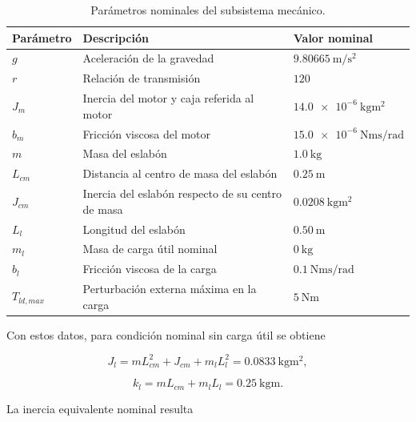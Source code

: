 \documentclass[10pt,a4paper]{article}
\begin{document}
\begin{table}[H]
    \centering
    \caption{Parámetros nominales del subsistema mecánico.}
    \label{tab:parametros_mecanicos}
    \begin{tabular}{lll}
        \toprule
        Parámetro & Descripción & Valor nominal \\
        \midrule
        \(g\) & Aceleración de la gravedad & \(\SI{9.80665}{\meter\per\second\squared}\) \\
        \(r\) & Relación de transmisión & \(120\) \\
        \(J_m\) & Inercia del motor y caja referida al motor & \(\SI{14.0e-6}{\kilogram\meter\squared}\) \\
        \(b_m\) & Fricción viscosa del motor & \(\SI{15.0e-6}{\newton\meter\second\per\radian}\) \\
        \(m\) & Masa del eslabón & \(\SI{1.0}{\kilogram}\) \\
        \(L_{cm}\) & Distancia al centro de masa del eslabón & \(\SI{0.25}{\meter}\) \\
        \(J_{cm}\) & Inercia del eslabón respecto de su centro de masa & \(\SI{0.0208}{\kilogram\meter\squared}\) \\
        \(L_l\) & Longitud del eslabón & \(\SI{0.50}{\meter}\) \\
        \(m_l\) & Masa de carga útil nominal & \(\SI{0}{\kilogram}\) \\
        \(b_l\) & Fricción viscosa de la carga & \(\SI{0.1}{\newton\meter\second\per\radian}\) \\
        \(T_{ld,max}\) & Perturbación externa máxima en la carga & \(\SI{5}{\newton\meter}\) \\
        \bottomrule
    \end{tabular}
\end{table}

Con estos datos, para condición nominal sin carga útil se obtiene

\begin{equation}
    J_l
    =
    m L_{cm}^{2}
    +
    J_{cm}
    +
    m_l L_l^{2}
    =
    \SI{0.0833}{\kilogram\meter\squared},
    \label{eq:jl_nominal}
\end{equation}

\begin{equation}
    k_l
    =
    m L_{cm}
    +
    m_l L_l
    =
    \SI{0.25}{\kilogram\meter}.
    \label{eq:kl_nominal}
\end{equation}

La inercia equivalente nominal resulta
\end{document}
